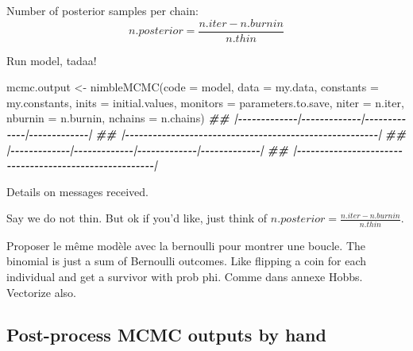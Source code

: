 \documentclass[
  12pt,
]{krantz}
\newenvironment{Shaded}{\begin{snugshade}}{\end{snugshade}}
\newcommand{\AttributeTok}[1]{\textcolor[rgb]{0.77,0.63,0.00}{#1}}
\newcommand{\DocumentationTok}[1]{\textcolor[rgb]{0.56,0.35,0.01}{\textbf{\textit{#1}}}}
\newcommand{\FunctionTok}[1]{\textcolor[rgb]{0.00,0.00,0.00}{#1}}
\newcommand{\NormalTok}[1]{#1}
\newcommand{\OtherTok}[1]{\textcolor[rgb]{0.56,0.35,0.01}{#1}}
\begin{document}
Number of posterior samples per chain:
\[n.posterior = \frac{n.iter - n.burnin}{n.thin}\]

Run model, tadaa!

\begin{Shaded}
\begin{Highlighting}[]
\NormalTok{mcmc.output }\OtherTok{\textless{}{-}} \FunctionTok{nimbleMCMC}\NormalTok{(}\AttributeTok{code =}\NormalTok{ model,}
                          \AttributeTok{data =}\NormalTok{ my.data,}
                          \AttributeTok{constants =}\NormalTok{ my.constants,}
                          \AttributeTok{inits =}\NormalTok{ initial.values,}
                          \AttributeTok{monitors =}\NormalTok{ parameters.to.save,}
                          \AttributeTok{niter =}\NormalTok{ n.iter,}
                          \AttributeTok{nburnin =}\NormalTok{ n.burnin,}
                          \AttributeTok{nchains =}\NormalTok{ n.chains)}
\DocumentationTok{\#\# |{-}{-}{-}{-}{-}{-}{-}{-}{-}{-}{-}{-}{-}|{-}{-}{-}{-}{-}{-}{-}{-}{-}{-}{-}{-}{-}|{-}{-}{-}{-}{-}{-}{-}{-}{-}{-}{-}{-}{-}|{-}{-}{-}{-}{-}{-}{-}{-}{-}{-}{-}{-}{-}|}
\DocumentationTok{\#\# |{-}{-}{-}{-}{-}{-}{-}{-}{-}{-}{-}{-}{-}{-}{-}{-}{-}{-}{-}{-}{-}{-}{-}{-}{-}{-}{-}{-}{-}{-}{-}{-}{-}{-}{-}{-}{-}{-}{-}{-}{-}{-}{-}{-}{-}{-}{-}{-}{-}{-}{-}{-}{-}{-}{-}|}
\DocumentationTok{\#\# |{-}{-}{-}{-}{-}{-}{-}{-}{-}{-}{-}{-}{-}|{-}{-}{-}{-}{-}{-}{-}{-}{-}{-}{-}{-}{-}|{-}{-}{-}{-}{-}{-}{-}{-}{-}{-}{-}{-}{-}|{-}{-}{-}{-}{-}{-}{-}{-}{-}{-}{-}{-}{-}|}
\DocumentationTok{\#\# |{-}{-}{-}{-}{-}{-}{-}{-}{-}{-}{-}{-}{-}{-}{-}{-}{-}{-}{-}{-}{-}{-}{-}{-}{-}{-}{-}{-}{-}{-}{-}{-}{-}{-}{-}{-}{-}{-}{-}{-}{-}{-}{-}{-}{-}{-}{-}{-}{-}{-}{-}{-}{-}{-}{-}|}
\end{Highlighting}
\end{Shaded}

Details on messages received.

Say we do not thin. But ok if you'd like, just think of \(n.posterior = \frac{n.iter - n.burnin}{n.thin}\).

Proposer le même modèle avec la bernoulli pour montrer une boucle. The binomial is just a sum of Bernoulli outcomes. Like flipping a coin for each individual and get a survivor with prob phi. Comme dans annexe Hobbs. Vectorize also.

\hypertarget{post-process-mcmc-outputs-by-hand}{%
\subsection{Post-process MCMC outputs by hand}\label{post-process-mcmc-outputs-by-hand}}
\end{document}
